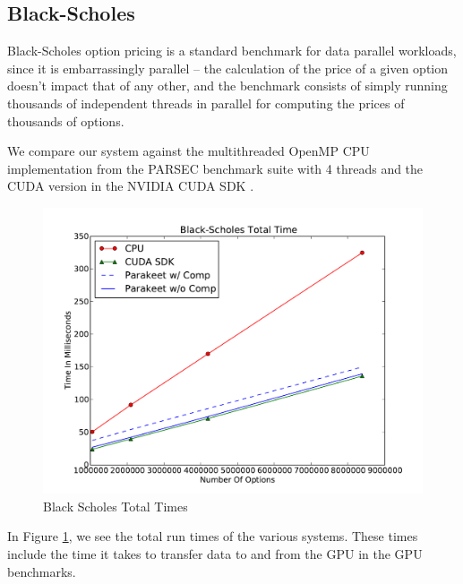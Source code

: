 \documentclass[preprint]{sigplanconf}
\begin{document}
\subsection{Black-Scholes}
Black-Scholes option pricing \cite{Blac73} is a standard benchmark for data parallel workloads, since it is embarrassingly parallel -- the calculation of the price of a given option doesn't impact that of any other, and the benchmark consists of simply running thousands of independent threads in parallel for computing the prices of thousands of options.

We compare our system against the multithreaded OpenMP CPU implementation from the PARSEC \cite{Bien08} benchmark suite with 4 threads and the CUDA version in the NVIDIA CUDA SDK \cite{NvidSD}.

\begin{figure}
\includegraphics[scale=0.45]{BSTotal.pdf}
\caption{Black Scholes Total Times}
\label{BSResults}
\end{figure}

In Figure \ref{BSResults}, we see the total run times of the various systems. These times include the time it takes to transfer data to and from the GPU in the GPU benchmarks.  
\end{document}
